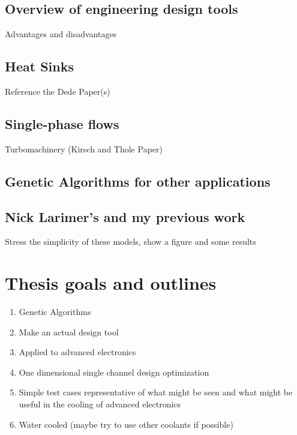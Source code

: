 	\subsection{Overview of engineering design tools}
		\noindent Advantages and disadvantages
	\subsection{Heat Sinks}
		\noindent Reference the Dede Paper(s)
	\subsection{Single-phase flows}
		\noindent Turbomachinery (Kirsch and Thole Paper)
	\subsection{Genetic Algorithms for other applications}
	\subsection {Nick Larimer's and my previous work}
		\noindent Stress the simplicity of these models, show a figure and some results

\section{Thesis goals and outlines}
	\begin{enumerate}
		\item Genetic Algorithms
		\item Make an actual design tool
		\item Applied to advanced electronics	
		\item One dimensional single channel design optimization
		\item Simple test cases representative of what might be seen and what might be useful in the cooling of advanced electronics
		\item Water cooled (maybe try to use other coolants if possible)
	\end{enumerate}


